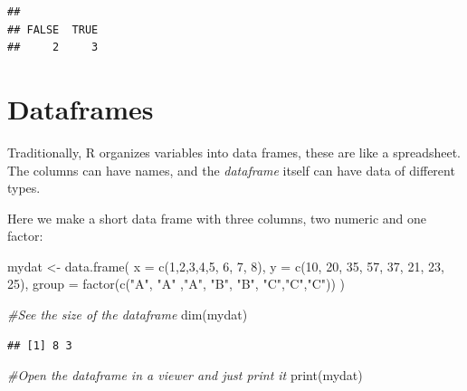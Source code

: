\documentclass[
]{book}
\newenvironment{Shaded}{\begin{snugshade}}{\end{snugshade}}
\newcommand{\AttributeTok}[1]{\textcolor[rgb]{0.77,0.63,0.00}{#1}}
\newcommand{\CommentTok}[1]{\textcolor[rgb]{0.56,0.35,0.01}{\textit{#1}}}
\newcommand{\DecValTok}[1]{\textcolor[rgb]{0.00,0.00,0.81}{#1}}
\newcommand{\FunctionTok}[1]{\textcolor[rgb]{0.00,0.00,0.00}{#1}}
\newcommand{\NormalTok}[1]{#1}
\newcommand{\OtherTok}[1]{\textcolor[rgb]{0.56,0.35,0.01}{#1}}
\newcommand{\StringTok}[1]{\textcolor[rgb]{0.31,0.60,0.02}{#1}}
\begin{document}
\begin{verbatim}
## 
## FALSE  TRUE 
##     2     3
\end{verbatim}

\hypertarget{dataframes}{%
\section{Dataframes}\label{dataframes}}

Traditionally, R organizes variables into data frames, these are like a
spreadsheet. The columns can have names, and the \emph{dataframe} itself can
have data of different types.

Here we make a short data frame with three columns, two numeric and one
factor:

\begin{Shaded}
\begin{Highlighting}[]
\NormalTok{mydat }\OtherTok{\textless{}{-}} \FunctionTok{data.frame}\NormalTok{(}
  \AttributeTok{x =} \FunctionTok{c}\NormalTok{(}\DecValTok{1}\NormalTok{,}\DecValTok{2}\NormalTok{,}\DecValTok{3}\NormalTok{,}\DecValTok{4}\NormalTok{,}\DecValTok{5}\NormalTok{, }\DecValTok{6}\NormalTok{, }\DecValTok{7}\NormalTok{, }\DecValTok{8}\NormalTok{),}
  \AttributeTok{y =} \FunctionTok{c}\NormalTok{(}\DecValTok{10}\NormalTok{, }\DecValTok{20}\NormalTok{, }\DecValTok{35}\NormalTok{, }\DecValTok{57}\NormalTok{, }\DecValTok{37}\NormalTok{, }\DecValTok{21}\NormalTok{, }\DecValTok{23}\NormalTok{, }\DecValTok{25}\NormalTok{),}
  \AttributeTok{group =} \FunctionTok{factor}\NormalTok{(}\FunctionTok{c}\NormalTok{(}\StringTok{"A"}\NormalTok{, }\StringTok{"A"}\NormalTok{ ,}\StringTok{"A"}\NormalTok{, }\StringTok{"B"}\NormalTok{, }\StringTok{"B"}\NormalTok{, }\StringTok{"C"}\NormalTok{,}\StringTok{"C"}\NormalTok{,}\StringTok{"C"}\NormalTok{))}
\NormalTok{)}

\CommentTok{\#See the size of the dataframe}
\FunctionTok{dim}\NormalTok{(mydat)}
\end{Highlighting}
\end{Shaded}

\begin{verbatim}
## [1] 8 3
\end{verbatim}

\begin{Shaded}
\begin{Highlighting}[]
\CommentTok{\#Open the dataframe in a viewer and just print it}
\FunctionTok{print}\NormalTok{(mydat)}
\end{Highlighting}
\end{Shaded}
\end{document}
